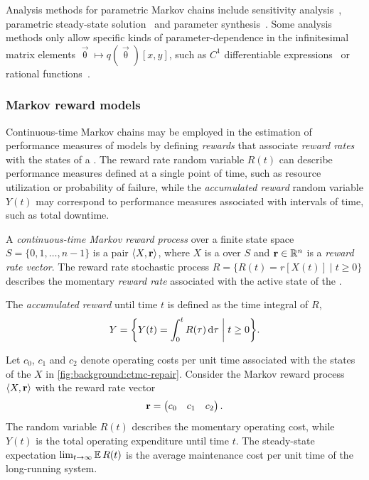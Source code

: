 Analysis methods for parametric Markov chains include sensitivity analysis~\citep{Blake88sensitivity}, parametric steady-state solution~\citep{Hahn11parametric,Voros17pdn} and parameter synthesis~\citep{Quatmann16mdp}. Some analysis methods only allow specific kinds of parameter-dependence in the infinitesimal matrix elements \(\vec{\uptheta} \mapsto q(\vec{\uptheta})[x, y]\), such as \(C^1\) differentiable expressions~\citep{Blake88sensitivity} or rational functions~\citep{Hahn11parametric}.

\subsubsection{Markov reward models}

Continuous-time Markov chains may be employed in the estimation of performance measures of models by defining \emph{rewards} that associate \emph{reward rates} with the states of a . The reward rate random variable $R(t)$ can describe performance measures defined at a single point of time, such as resource utilization or probability of failure, while the \emph{accumulated reward} random variable $Y(t)$ may correspond to performance measures associated with intervals of time, such as total downtime.

\begin{dfn}
  A \emph{continuous-time Markov reward process} over a finite state space \(S = \{0, 1, \ldots, n - 1\}\) is a pair \(\ltup X, \vec{r} \rtup\), where \(X\) is a  over \(S\) and \(\vec{r} \in \RR^n\) is a \emph{reward rate vector}. The reward rate stochastic process \(R = \{ R(t) = r[X(t)] \mid t \ge 0 \}\) describes the momentary \emph{reward rate} associated with the active state of the .

  The \emph{accumulated reward} until time \(t\) is defined as the time integral of \(R\),
  \begin{equation}
    Y = \biggl\{ Y(t) = \int_{0}^t R(\tau) \,\dd \tau \biggm\vert t \ge 0 \biggr\}\text.
  \end{equation}
\end{dfn}

\begin{example}
  Let \(c_0\), \(c_1\) and \(c_2\) denote operating costs per unit time associated with the states of the  \(X\) in \vref{fig:background:ctmc-repair}. Consider the Markov reward process \(\ltup X, \vec{r} \rtup\) with the reward rate vector
  \begin{equation}
    \vec{r} = \begin{pmatrix} c_0 & c_1 & c_2 \end{pmatrix} \text.
  \end{equation}
  The random variable \(R(t)\) describes the momentary operating cost, while \(Y(t)\) is the total operating expenditure until time \(t\). The steady-state expectation \(\lim_{t \to \infty} \Ex R(t)\) is the average maintenance cost per unit time of the long-running system.
\end{example}

